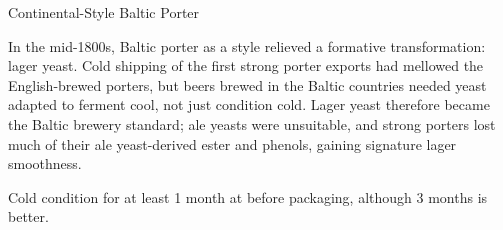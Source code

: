 \stylesection{\stylebalticporter}

\begin{recipe}{Continental-Style Baltic Porter}

\begin{aboutblock}
In the mid-1800s, Baltic porter as a style relieved a formative transformation:
lager yeast. Cold shipping of the first strong porter exports had mellowed the
English-brewed porters, but beers brewed in the Baltic countries needed yeast
adapted to ferment cool, not just condition cold. Lager yeast therefore became
the Baltic brewery standard; ale yeasts were unsuitable, and strong porters
lost much of their ale yeast-derived ester and phenols, gaining signature
lager smoothness. 
\end{aboutblock}


\begin{methodandtiming}
 
\begin{mashsteps}
\end{mashsteps}

\begin{fermentationsteps}
\end{fermentationsteps}

\begin{directions}
Cold condition for at least 1 month at  before packaging, although
3 months is better.
\end{directions}

\end{methodandtiming}

\recipebreak

\begin{ingredientsblock}

\begin{malts}
\end{malts}

\begin{hops}
\end{hops}


\end{ingredientsblock}

\end{recipe}

